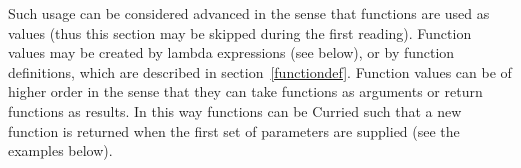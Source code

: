 \documentclass[\pformat,12pt]{article}
\begin{document}
Such usage can be considered advanced in the sense
that functions are used as values (thus this section
may be skipped during the first reading). Function values may be created by
lambda expressions (see below), or by function definitions, which are
described in section~\ref{functiondef}.  Function values can be of
higher order in the sense that they can take functions as arguments or
return functions as results. In this way functions can be Curried such
that a new function is returned when the first set of parameters are
supplied (see the examples below).

\end{document}
